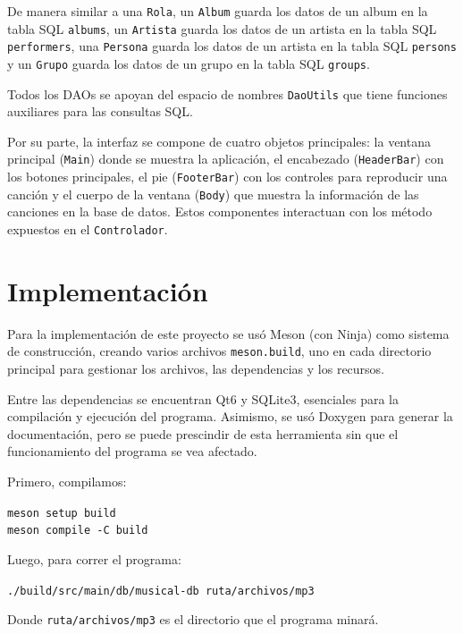 \documentclass[12pt]{article}  %
\begin{document}
De manera similar a una \texttt{Rola}, un \texttt{Album} guarda los datos de un
album en la tabla SQL \texttt{albums}, un \texttt{Artista} guarda los datos de
un artista en la tabla SQL \texttt{performers}, una \texttt{Persona} guarda los
datos de un artista en la tabla SQL \texttt{persons} y un \texttt{Grupo} guarda
los datos de un grupo en la tabla SQL \texttt{groups}.

Todos los DAOs se apoyan del espacio de nombres \texttt{DaoUtils} que tiene
funciones auxiliares para las consultas SQL.

Por su parte, la interfaz se compone de cuatro objetos principales: la ventana
principal (\texttt{Main}) donde se muestra la aplicación, el encabezado
(\texttt{HeaderBar}) con los botones principales, el pie (\texttt{FooterBar})
con los controles para reproducir una canción y el cuerpo de la ventana
(\texttt{Body}) que muestra la información de las canciones en la base de
datos. Estos componentes interactuan con los método expuestos en el
\texttt{Controlador}.

\section{Implementación}

Para la implementación de este proyecto se usó Meson (con Ninja) como sistema de
construcción, creando varios archivos \texttt{meson.build}, uno en cada
directorio principal para gestionar los archivos, las dependencias y los
recursos.

Entre las dependencias se encuentran Qt6 y SQLite3, esenciales para la
compilación y ejecución del programa. Asimismo, se usó Doxygen para generar la
documentación, pero se puede prescindir de esta herramienta sin que el
funcionamiento del programa se vea afectado.

Primero, compilamos:

\begin{center}
    {\texttt{meson setup build \\
            meson compile -C build}}
\end{center}

Luego, para correr el programa:

\vspace{1.2em}
\centerline{\texttt{./build/src/main/db/musical-db ruta/archivos/mp3}}
\vspace{1.2em}

Donde \texttt{ruta/archivos/mp3} es el directorio que el programa minará.
\end{document}

